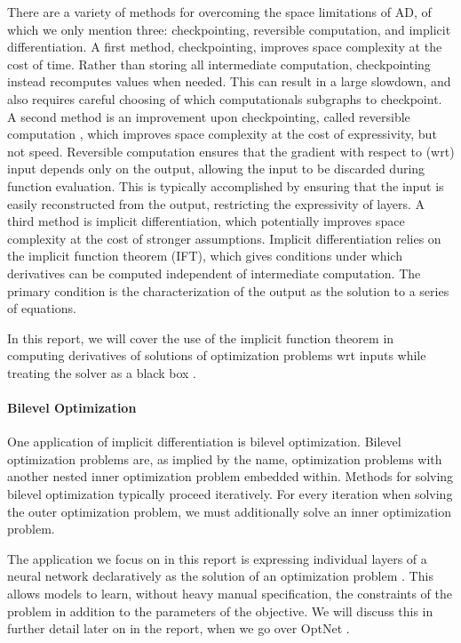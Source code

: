 \documentclass[11pt]{article}
\begin{document}
There are a variety of methods for overcoming the space limitations of AD,
of which we only mention three: checkpointing, reversible computation, and implicit differentiation.
A first method, checkpointing, improves space complexity at the cost of time.
Rather than storing all intermediate computation,
checkpointing instead recomputes values when needed.
This can result in a large slowdown,
and also requires careful choosing of which computationals subgraphs to checkpoint.
A second method is an improvement upon checkpointing, called reversible computation \citep{maclaurin2015reversible,gomez2017reversible},
which improves space complexity at the cost of expressivity, but not speed.
Reversible computation ensures that the gradient with respect to (wrt) input depends only on the output,
allowing the input to be discarded during function evaluation.
This is typically accomplished by ensuring that the input is easily reconstructed from the output,
restricting the expressivity of layers.
A third method is implicit differentiation,
which potentially improves space complexity at the cost of stronger assumptions.
Implicit differentiation relies on the implicit function theorem (IFT),
which gives conditions under which derivatives can be computed independent of
intermediate computation.
The primary condition is the characterization of the output as the solution
to a series of equations.

In this report, we will cover the use of the implicit function theorem
in computing derivatives of solutions of optimization problems wrt inputs
while treating the solver as a black box \citep{optnet}.

\paragraph{Bilevel Optimization}
One application of implicit differentiation is bilevel optimization.
Bilevel optimization problems are, as implied by the name,
optimization problems with another nested inner optimization problem embedded within.
Methods for solving bilevel optimization typically proceed iteratively.
For every iteration when solving the outer optimization problem,
we must additionally solve an inner optimization problem.

The application we focus on in this report is expressing individual layers of a neural network declaratively
as the solution of an optimization problem \citep{optnet,agrawal2019diffcvx,gould2019declarative}.
This allows models to learn, without heavy manual specification, the constraints of the problem
in addition to the parameters of the objective.
We will discuss this in further detail later on in the report,
when we go over OptNet \citep{optnet}.
\end{document}
